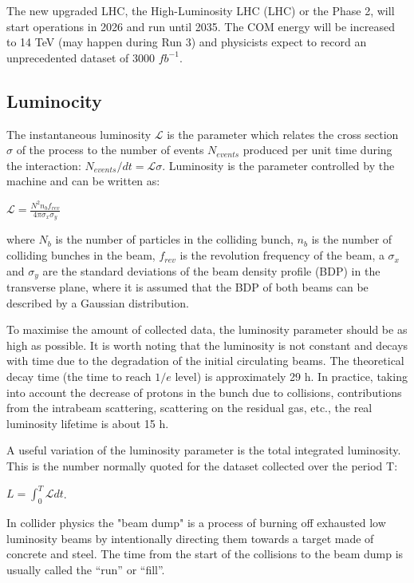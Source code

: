 \begin{normalsize}
The new upgraded LHC, the High-Luminosity LHC (LHC) or the Phase 2, will start operations in 2026 and run until 2035. The COM energy will be increased to 14 TeV (may happen during Run 3) and physicists expect to record an unprecedented dataset of 3000 $fb^{-1}$. 

\subsection{Luminocity}


The instantaneous luminosity $ \mathcal{L} $ is the parameter which relates the cross section $\sigma$ of the process to the number of events $N_{events}$ produced per unit time during the interaction: $N_{events} / dt = \mathcal{L}  \sigma$. Luminosity is the parameter controlled by the machine and can be written as:

$ \mathcal{L} =\frac{N^2 n_b f_{rev}}{4\pi \sigma_x \sigma_y}$

\noindent where $N_b$ is the number of particles in the colliding bunch, $n_b$ is the number of colliding bunches in the beam, $f_{rev}$ is the revolution frequency of the beam, a $\sigma_x$ and $\sigma_y$ are the standard deviations of the beam density profile (BDP) in the transverse plane, where it is assumed that the BDP of both beams can be described by a Gaussian distribution.


To maximise the amount of collected data, the luminosity parameter should be as high as possible. It is worth noting that the luminosity is not constant and decays with time due to the degradation of the initial circulating beams. The theoretical decay time (the time to reach $1/e$ level) is approximately 29 h. In practice, taking into account the decrease of protons in the bunch due to collisions, contributions from the intrabeam scattering, scattering on the residual gas, etc., the real luminosity lifetime is about 15 h. 

A useful variation of the luminosity parameter is the total integrated luminosity. This is the number normally quoted for the dataset collected over the period T:

$L = \int_{0}^{T} \mathcal{L}  dt$.

In collider physics the "beam dump" is a process of burning off exhausted low luminosity beams by intentionally directing them towards a target made of concrete and steel. The time from the start of the collisions to the beam dump is usually called the ``run'' or ``fill''.


\end{normalsize}
